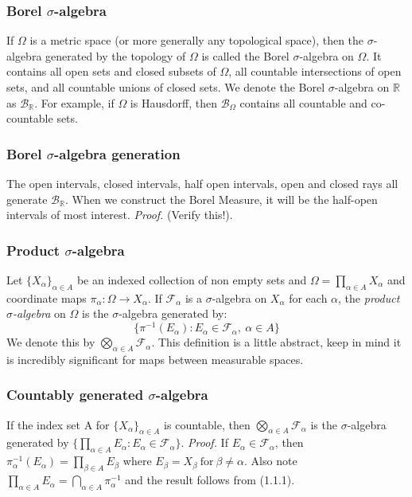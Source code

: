 \documentclass{article}
\begin{document}
\subsubsection{Borel $\sigma$-algebra}
If $\Omega$ is a metric space (or more generally any topological space), then the $\sigma$-algebra generated by the topology of $\Omega$ is called the Borel $\sigma$-algebra on $\Omega$. It contains all open sets and closed subsets of $\Omega$, all countable intersections of open sets, and all countable unions of closed sets.\newline \newline
We denote the Borel $\sigma$-algebra on $\mathbb{R}$ as $\mathcal{B}_{\mathbb{R}}$. For example, if $\Omega$ is Hausdorff, then $\mathcal{B}_{\Omega}$ contains all countable and co-countable sets. 

\subsubsection{Borel $\sigma$-algebra generation}
The open intervals, closed intervals, half open intervals, open and closed rays all generate $\mathcal{B}_{\mathbb{R}}$. When we construct the Borel Measure, it will be the half-open intervals of most interest.\newline \newline
\textit{Proof.} \newline \newline
(Verify this!). 

\subsubsection{Product $\sigma$-algebra}
Let $\{X_\alpha\}_{\alpha\in A}$ be an indexed collection of non empty sets and $\Omega=\prod_{\alpha\in A}X_{\alpha}$ and coordinate maps $\pi_{\alpha}:\Omega\to X_{\alpha}$. If $\mathcal{F}_{\alpha}$ is a $\sigma$-algebra on $X_{\alpha}$ for each $\alpha$, the \emph{product $\sigma$-algebra} on $\Omega$ is the $\sigma$-algebra generated by:
\[
\{ \pi^{-1}(E_{\alpha}):E_{\alpha}\in \mathcal{F_{\alpha}}, \ \alpha  \in A\}
\]
We denote this by $\bigotimes_{\alpha\in A}\mathcal{F}_{\alpha}$. This definition is a little abstract, keep in mind it is incredibly significant for  maps between measurable spaces.

\subsubsection{Countably generated $\sigma$-algebra}
If the index set A for $\{X_\alpha\}_{\alpha\in A}$ is countable, then $\bigotimes_{\alpha\in A}\mathcal{F}_{\alpha}$ is the $\sigma$-algebra generated by $\{\prod_{\alpha \in A}E_{\alpha}:E_{\alpha} \in \mathcal{F}_{\alpha}\}$. \newline \newline
\textit{Proof.} \newline \newline
If $E_{\alpha} \in \mathcal{F}_{\alpha}$, then $\pi^{-1}_{\alpha}(E_{\alpha})=\prod_{\beta \in A}E_{\beta}$ where $E_{\beta} = X_{\beta} \ \text{for} \ \beta \neq \alpha$. Also note $\prod_{\alpha \in A}E_{\alpha}=\bigcap_{\alpha \in A}\pi^{-1}_{\alpha}$ and the result follows from (1.1.1).
\end{document}
